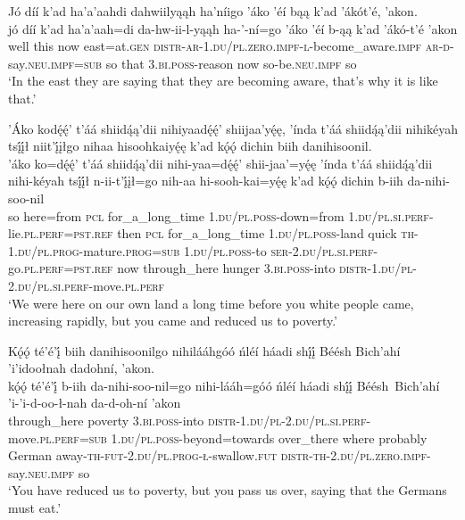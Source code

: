 \ea\label{ex:text7-17-13}
Jó díí k’ad ha’a’aahdi dahwiilyąąh ha’níigo ’áko ’éí bąą k’ad ’ákót’é, ’akon.\\
\gll jó	díí	k’ad	ha’a’aah=di	da-hw-ii-l-yąąh	ha-’-ní=go	’áko	’éí	b-ąą	k’ad	’ákó-t’é	’akon\\
     well	this	now	east=at.\textsc{gen}	\textsc{distr}-\textsc{ar}-1.\textsc{du}/\textsc{pl}.\textsc{zero}.\textsc{impf}-\textsc{l}-become\_aware.\textsc{impf}	\textsc{ar}-\textsc{d}-say.\textsc{neu}.\textsc{impf}=\textsc{sub}	so	that	3.\textsc{bi}.\textsc{poss}-reason	now	so-be.\textsc{neu}.\textsc{impf}	so\\
\glt `In the east they are saying that they are becoming aware, that’s why it is like that.'
\z

\ea\label{ex:text7-17-14}
’Áko kodę́ę́’ t’áá shiidą́ą’dii nihiyaadę́ę́’ shiijaa’yę́ę, ’índa t’áá shiidą́ą’dii nihikéyah tsį́į́ł niit’į́įłgo nihaa hisoohkaiyę́ę k’ad kǫ́ǫ́ dichin biih danihisoonil.\\
\gll ’áko	ko=dę́ę́’	t’áá	shiidą́ą’dii	nihi-yaa=dę́ę́’	shii-jaa’=yę́ę	’índa	t’áá	shiidą́ą’dii	nihi-kéyah	tsį́į́ł	n-ii-t’į́įł=go	nih-aa	hi-sooh-kai=yę́ę	k’ad	kǫ́ǫ́	dichin	b-iih	da-nihi-soo-nil\\
     so	here=from	\textsc{pcl}	for\_a\_long\_time	1.\textsc{du}/\textsc{pl}.\textsc{poss}-down=from	1.\textsc{du}/\textsc{pl}.\textsc{si}.\textsc{perf}-lie.\textsc{pl}.\textsc{perf}=\textsc{pst}.\textsc{ref}	then	\textsc{pcl}	for\_a\_long\_time	1.\textsc{du}/\textsc{pl}.\textsc{poss}-land	quick	\textsc{th}-1.\textsc{du}/\textsc{pl}.\textsc{prog}-mature.\textsc{prog}=\textsc{sub}	1.\textsc{du}/\textsc{pl}.\textsc{poss}-to	\textsc{ser}-2.\textsc{du}/\textsc{pl}.\textsc{si}.\textsc{perf}-go.\textsc{pl}.\textsc{perf}=\textsc{pst}.\textsc{ref}	now	through\_here	hunger	3.\textsc{bi}.\textsc{poss}-into	\textsc{distr}-1.\textsc{du}/\textsc{pl}-2.\textsc{du}/\textsc{pl}.\textsc{si}.\textsc{perf}-move.\textsc{pl}.\textsc{perf}\\
\glt `We were here on our own land a long time before you white people came, increasing rapidly, but you came and reduced us to poverty.'
\z

\ea\label{ex:text7-17-15}
Kǫ́ǫ́ té’é’į́ biih danihisoonilgo nihilááhgóó ńléí háadi shį́į́ Béésh Bich’ahí ’i’idoołnah dadohní, ’akon.\\
\gll kǫ́ǫ́	té’é’į́	b-iih	da-nihi-soo-nil=go	nihi-lááh=góó	ńléí	háadi	shį́į́	Béésh~{Bich’ahí}	’i-’i-d-oo-ł-nah	da-d-oh-ní	’akon\\
     through\_here	poverty	3.\textsc{bi}.\textsc{poss}-into	\textsc{distr}-1.\textsc{du}/\textsc{pl}-2.\textsc{du}/\textsc{pl}.\textsc{si}.\textsc{perf}-move.\textsc{pl}.\textsc{perf}=\textsc{sub}	1.\textsc{du}/\textsc{pl}.\textsc{poss}-beyond=towards	over\_there	where	probably	German	away-\textsc{th}-\textsc{fut}-2.\textsc{du}/\textsc{pl}.\textsc{prog}-\textsc{ł}-swallow.\textsc{fut}	\textsc{distr}-\textsc{th}-2.\textsc{du}/\textsc{pl}.\textsc{zero}.\textsc{impf}-say.\textsc{neu}.\textsc{impf}	so\\
\glt `You have reduced us to poverty, but you pass us over, saying that the Germans must eat.'
\z

